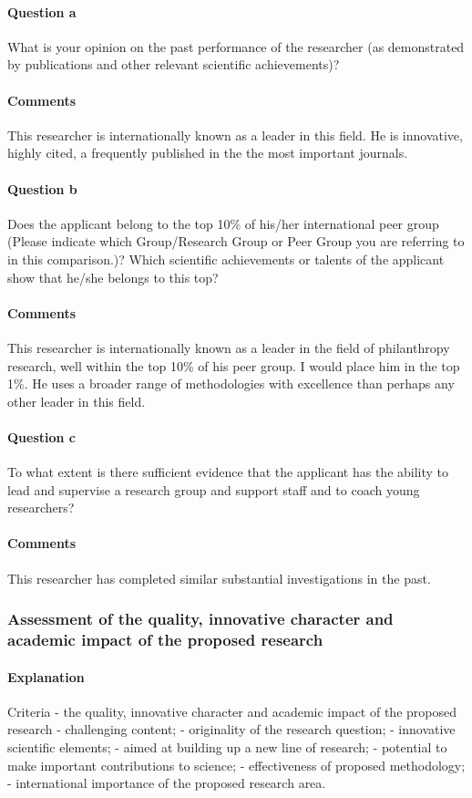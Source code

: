 \documentclass[twocolumn, serif, rga, numeric]{jote-article}
\begin{document}
\paragraph{Question a}
What is your opinion on the past performance of the researcher (as demonstrated by publications and other relevant scientific achievements)?
\paragraph{Comments}
This researcher is internationally known as a leader in this field. He is innovative, highly cited, a frequently published in the the most important journals.
\paragraph{Question b}
Does the applicant belong to the top 10\% of his/her international peer group (Please indicate which Group/Research Group or Peer Group you are referring to in this comparison.)? Which scientific achievements or talents of the applicant show that he/she belongs to this top?
\paragraph{Comments}
This researcher is internationally known as a leader in the field of philanthropy research, well within the top 10\% of his peer group. I would place him in the top 1\%. He uses a broader range of methodologies with excellence than perhaps any other leader in this field.
\paragraph{Question c}
To what extent is there sufficient evidence that the applicant has the ability to lead and supervise a research group and support staff and to coach young researchers?
\paragraph{Comments}
This researcher has completed similar substantial investigations in the past.

\subsubsection{Assessment of the quality, innovative character and academic impact of the proposed research}
\paragraph{Explanation}
Criteria - the quality, innovative character and academic impact of the proposed research - challenging content; - originality of the research question; - innovative scientific elements; - aimed at building up a new line of research; - potential to make important contributions to science; - effectiveness of proposed methodology; - international importance of the proposed research area.
\end{document}
